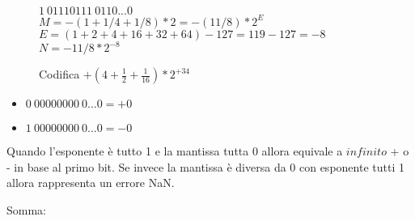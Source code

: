 \documentclass[a4paper]{article}
\theoremstyle{break}
\theoremstyle{break}
\theoremstyle{break}
\theoremstyle{break}
\theoremstyle{break}
\begin{document}
\begin{figure}[H]
	\begin{example}
		$1\:01110111\:0110...0$\\
		$M = -(1+1/4+1/8)*2 = -(11/8)*2^{E}$\\
		$E = (1+2+4+16+32+64)-127=119-127=-8$\\
		$N = -11/8 * 2^{-8}$
	\end{example}
\end{figure}

\begin{figure}[H]
	\begin{exercise}
		Codifica $+(4+\frac{1}{2}+\frac{1}{16})*2^{+34}$
	\end{exercise}
\end{figure}

\begin{itemize}
	\item $0\:00000000\:0...0 = +0$
	\item $1\:00000000\:0...0 = -0$
\end{itemize}

Quando l'esponente è tutto 1 e la mantissa tutta 0 allora equivale a $infinito$
+ o - in base al primo bit. Se invece la mantissa è diversa da 0 con esponente tutti 1
allora rappresenta un errore NaN.

Somma:\\
\label{es2}
\end{document}
